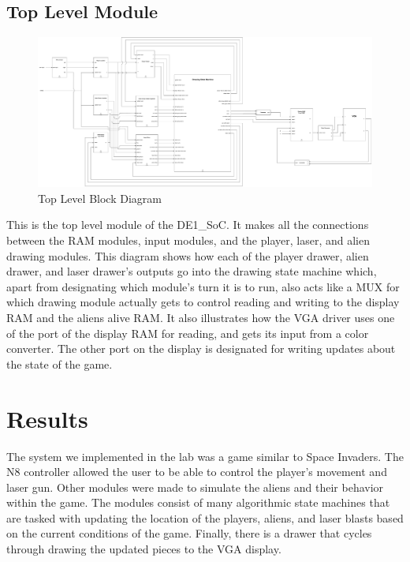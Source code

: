 \documentclass[11pt, titlepage]{article}
\begin{document}
        \subsection{Top Level Module}
            \begin{figure}[H]
                \centering
                \includegraphics[scale = 0.17]{Images/Top Level Module Block Diagram.pdf}
                \caption{Top Level Block Diagram}
            \end{figure}
            This is the top level module of the DE1\_SoC. It makes all the connections between the RAM modules, input modules, and the player, laser, and alien drawing modules. This diagram shows how each of the player drawer, alien drawer, and laser drawer's outputs go into the drawing state machine which, apart from designating which module's turn it is to run, also acts like a MUX for which drawing module actually gets to control reading and writing to the display RAM and the aliens alive RAM. It also illustrates how the VGA driver uses one of the port of the display RAM for reading, and gets its input from a color converter. The other port on the display is designated for writing updates about the state of the game. 

    \section{Results}
    The system we implemented in the lab was a game similar to Space Invaders. The N8 controller allowed the user to be able to control the player's movement and laser gun. Other modules were made to simulate the aliens and their behavior within the game. The modules consist of many algorithmic state machines that are tasked with updating the location of the players, aliens, and laser blasts based on the current conditions of the game. Finally, there is a drawer that cycles through drawing the updated pieces to the VGA display.
\end{document}
